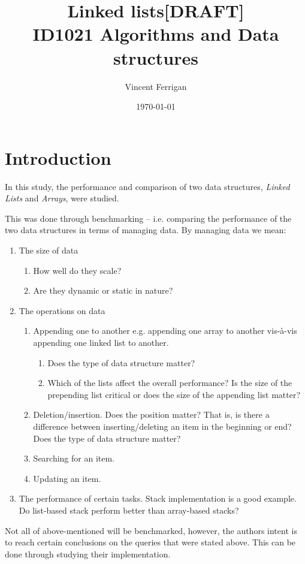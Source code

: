 \documentclass[a4paper, 11pt]{article}
\title{Linked lists[DRAFT]\\ \small{ID1021 Algorithms and Data structures}} %
\author{Vincent Ferrigan}
\date{\today}
\begin{document}
    \maketitle
    \section*{Introduction}
    In this study, the performance and comparison of two data structures,
    \emph{Linked Lists} and \emph{Arrays}, were studied. 
    
    This was done through benchmarking -- i.e. comparing the performance of
    the two data structures in terms of managing data. 
    By managing data we mean:
    
    \begin{enumerate}[label*=\arabic*.]
        \item The size of data
        \begin{enumerate}[label*=\arabic*.]
            \item How well do they scale?
            \item Are they dynamic or static in nature? 
        \end{enumerate}
        \item The operations on data
        \begin{enumerate}[label*=\arabic*.]
            \item Appending one to another e.g. appending one array to another
            vis-à-vis appending one linked list to another. 
            \begin{enumerate}[label*=\arabic*.]
                \item Does the type of data structure matter?
                \item Which of the lists affect the overall performance?
                Is the size of the prepending list critical or does the size of
                the appending list matter?
            \end{enumerate}
            \item Deletion/insertion. Does the position matter? That is, is
            there a difference between inserting/deleting an item in the
            beginning or end? Does the type of data structure matter?
            \item Searching for an item.
            \item Updating an item. 
        \end{enumerate}
        \item The performance of certain tasks. 
        Stack implementation is a good example. 
        Do list-based stack perform better than array-based stacks?
    \end{enumerate}
    Not all of above-mentioned will be benchmarked, however, the authors intent is to
    reach certain conclusions on the queries that were stated above. 
    This can be done through studying their implementation. 
            
\end{document}
